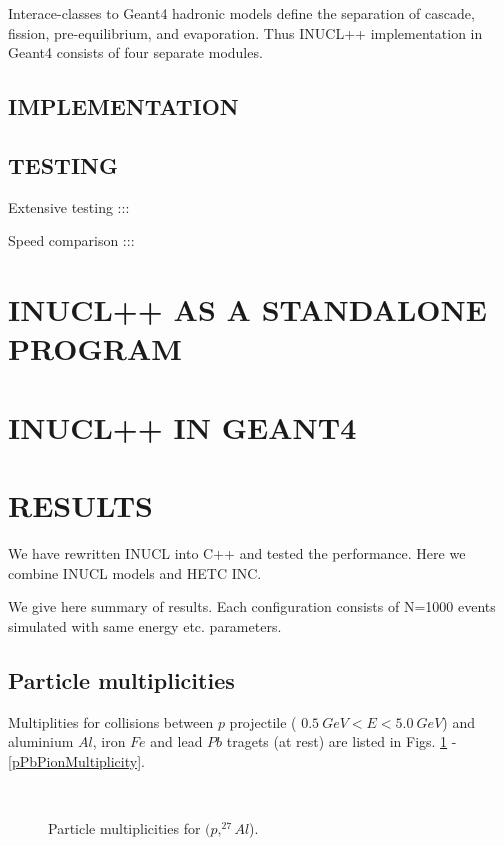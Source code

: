 Interace-classes to Geant4 hadronic models define the separation of
cascade, fission, pre-equilibrium, and evaporation. Thus INUCL++
implementation in Geant4 consists of four separate modules.

\subsection{IMPLEMENTATION}

\subsection{TESTING}
Extensive testing :::

Speed comparison :::

\section{INUCL++ AS A STANDALONE PROGRAM}

\section{INUCL++ IN GEANT4}

\section{RESULTS}
We have rewritten INUCL into C++ and tested the performance.
Here we combine INUCL models and HETC INC.


We give here summary of results. Each configuration consists of N=1000 events simulated with same energy etc. parameters. 

\subsection{Particle multiplicities}
Multiplities for collisions between $p$  projectile ( $0.5~GeV< E <5.0~GeV$) and aluminium $Al$, iron $Fe$ and lead $Pb$ tragets (at rest) are listed in Figs. \ref{pAlMultiplicity} - \ref{pPbPionMultiplicity}.



\begin{figure}
  \begin{center}
    \leavevmode
    \mbox{\epsfxsize=8cm  }
       \caption{Particle multiplicities for $(p, ^{27}Al$).}
  \label{pAlMultiplicity}
  \end{center}
\end{figure}



